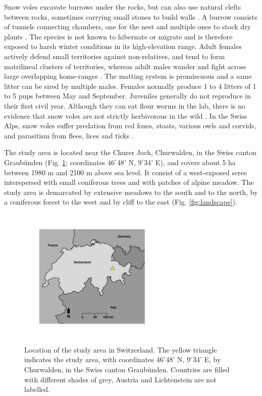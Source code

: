 Snow voles excavate burrows under the rocks, but can also use natural clefts between rocks, sometimes carrying small stones to build walls \parencite{Niederer2008}. A burrow consists of tunnels connecting chambers, one for the nest and multiple ones to stock dry plants \parencite{Janeau1997}. The species is not known to hibernate or migrate and is therefore exposed to harsh winter conditions in its high-elevation range. 
Adult females actively defend small territories against non-relatives, and tend to form matrilineal clusters of territories, whereas adult males wander and fight across large overlapping home-ranges \parencite{Luque-larena2004, Garcia-Navas2016}. The matting system is promiscuous and a same litter can be sired by multiple males. Females normally produce 1 to 4 litters of 1 to 5 pups between May and September. Juveniles generally do not reproduce in their first civil year. 
Although they can eat flour worms in the lab, there is no evidence that snow voles are not strictly herbivorous in the wild \parencite{Janeau1997}. In the Swiss Alps, snow voles suffer predation from red foxes, stoats, various owls and corvids, and parasitism from flees, lices and ticks \parencite{Janeau1997, Martinoli2001}.

The study area is located near the Churer Joch, Churwalden, in the Swiss canton Graub\"unden (Fig. \ref{fig:map}; coordinates $46^{\circ}$48' N, $9^{\circ}$34' E), and covers about 5 ha between 1980 m and 2100 m above sea level. It consist of a west-exposed scree interspersed with small coniferous trees and with patches of alpine meadow. The study area is demarcated by extensive meadows to the south and to the north, by a coniferous forest to the west and by cliff to the east (Fig. \ref{fig:landscape}). 
\begin{figure}[ht]
	\centering
	\includegraphics[width=0.6\textwidth]{FiguresGeneral/Map/figure/map-1.pdf}
	\caption{Location of the study area in Switzerland. The yellow triangle indicates the study area, with coordinates $46^{\circ}$48' N, $9^{\circ}$34' E, by Churwalden, in the Swiss canton Graub\"unden. Countries are filled with different shades of grey, Austria and Lichtenstein are not labelled.}
	\label{fig:map}
\end{figure}


